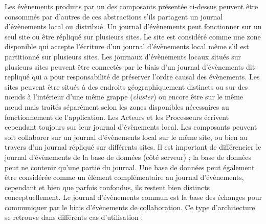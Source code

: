 Les évènements produits par un des composants présentée ci-dessus
peuvent être consommés par d'autres de ces abstractions s'ils partagent un 
journal d'évènements local ou distribué. Un journal d'évènements peut 
fonctionner sur un seul site ou être répliqué 
sur plusieurs sites. 
Le site est considéré comme une zone disponible qui accepte 
l'écriture d'un journal d'évènements local même s'il est partitionné sur plusieurs 
sites. Les journaux d'évènements locaux situés sur plusieurs sites peuvent être 
connectés par le biais d'un journal d'évènements dit \og repliqué\fg{} qui a pour 
responsabilité de préserver l'ordre causal des évènements. Les sites peuvent être situés à des endroits géographiquement distincts 
ou sur 
des nœuds à l'intérieur d'une même grappe (\textit{cluster}) ou encore être sur le 
même nœud mais traités séparément selon les zones 
disponibles nécessaires au fonctionnement de l'application. 
Les Acteurs et les Processeurs écrivent cependant toujours sur leur journal 
d'évènements local. 
Les composants peuvent soit collaborer sur un journal d'évènements local sur le 
même site, ou bien au travers d'un journal répliqué sur différents sites.
Il est important de différencier le journal d'évènements de la base de données 
(côté serveur) ; la base de données peut ne contenir qu'une partie du journal. 
Une base de données peut également être considérée comme un élément 
complémentaire au journal d'évènements, cependant et bien que parfois 
confondus, ils restent bien distincts conceptuellement.
Le journal d'évènements commun est la base des échanges pour communiquer 
par le biais d'évènements de collaboration. Ce type d'architecture se retrouve dans 
différents cas d'utilisation :
